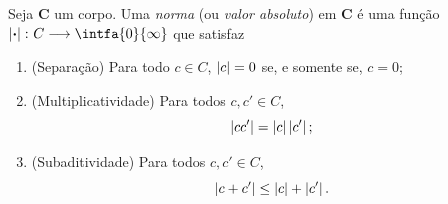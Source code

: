 \begin{defi}
Seja $\bm C$ um corpo. Uma \emph{norma} (ou \emph{valor absoluto}) em $\bm C$ é uma função $\abs{\var}\colon C \to \intfa{0}{\infty}$ que satisfaz
	\begin{enumerate}
	\item (Separação) Para todo $c \in C$, $\left\vert{c}\right\vert=0$ se, e somente se, $c=0$;
	\item (Multiplicatividade) Para todos $c,c' \in C$,
		\begin{equation*}
		\left\vert{cc'}\right\vert = \left\vert{c}\right\vert\left\vert{c'}\right\vert;
		\end{equation*}
	\item (Subaditividade) Para todos $c,c' \in C$,
		\begin{equation*}
		\left\vert{c+c'}\right\vert \leq \left\vert{c}\right\vert + \left\vert{c'}\right\vert.
		\end{equation*}
	\end{enumerate}
\end{defi}

